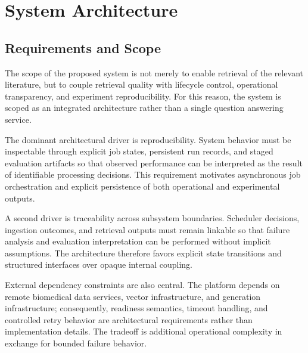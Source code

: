 \chapter{System Architecture}

\section{Requirements and Scope}

The scope of the proposed system is not merely to enable retrieval of the relevant literature, but to couple retrieval quality with lifecycle control, operational transparency, and experiment reproducibility. For this reason, the system is scoped as an integrated architecture rather than a single question answering service.

The dominant architectural driver is reproducibility. System behavior must be inspectable through explicit job states, persistent run records, and staged evaluation artifacts so that observed performance can be interpreted as the result of identifiable processing decisions. This requirement motivates asynchronous job orchestration and explicit persistence of both operational and experimental outputs.

A second driver is traceability across subsystem boundaries. Scheduler decisions, ingestion outcomes, and retrieval outputs must remain linkable so that failure analysis and evaluation interpretation can be performed without implicit assumptions. The architecture therefore favors explicit state transitions and structured interfaces over opaque internal coupling.

External dependency constraints are also central. The platform depends on remote biomedical data services, vector infrastructure, and generation infrastructure; consequently, readiness semantics, timeout handling, and controlled retry behavior are architectural requirements rather than implementation details. The tradeoff is additional operational complexity in exchange for bounded failure behavior.

